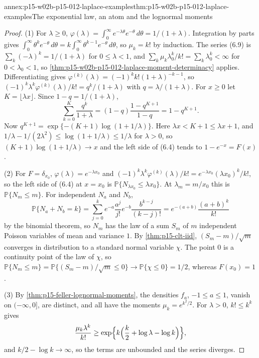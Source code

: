 \begin{annexitem}{annex:p15-w02b-p15-012-laplace-examples}{thm:p15-w02b-p15-012-laplace-examples}{The exponential law, an atom and the lognormal moments}
\begin{proof}
(1) For \(\lambda\geq0\),
\(\varphi(\lambda)=\int_0^\infty e^{-\lambda\theta}e^{-\theta}\,d\theta=1/(1+\lambda)\).
Integration by parts gives
\(\int_0^\infty\theta^ke^{-\theta}\,d\theta=k\int_0^\infty\theta^{k-1}e^{-\theta}\,d\theta\),
so \(\mu_k=k!\) by induction. The series (6.9) is
\(\sum_k(-\lambda)^k=1/(1+\lambda)\) for \(0\leq\lambda<1\), and
\(\sum_k\mu_k\lambda_0^k/k!=\sum_k\lambda_0^k<\infty\) for
\(0<\lambda_0<1\), so \cref{thm:p15-w02b-p15-012-laplace-moment-determinacy}
applies. Differentiating gives
\(\varphi^{(k)}(\lambda)=(-1)^kk!(1+\lambda)^{-k-1}\), so
\((-1)^k\lambda^k\varphi^{(k)}(\lambda)/k!=q^k/(1+\lambda)\) with
\(q=\lambda/(1+\lambda)\). For \(x\geq0\) let \(K=\lfloor\lambda x\rfloor\).
Since \(1-q=1/(1+\lambda)\),
\[
 \sum_{k=0}^K\frac{q^k}{1+\lambda}=(1-q)\frac{1-q^{K+1}}{1-q}=1-q^{K+1}.
\]
Now \(q^{K+1}=\exp\{-(K+1)\log(1+1/\lambda)\}\). Here
\(\lambda x<K+1\leq\lambda x+1\), and
\(1/\lambda-1/(2\lambda^2)\leq\log(1+1/\lambda)\leq1/\lambda\) for
\(\lambda>0\), so \((K+1)\log(1+1/\lambda)\to x\) and the left side of (6.4)
tends to \(1-e^{-x}=F(x)\).

(2) For \(F=\delta_{x_0}\), \(\varphi(\lambda)=e^{-\lambda x_0}\) and
\((-1)^k\lambda^k\varphi^{(k)}(\lambda)/k!=e^{-\lambda x_0}(\lambda x_0)^k/k!\),
so the left side of (6.4) at \(x=x_0\) is
\(\mathbb P\{N_{\lambda x_0}\leq\lambda x_0\}\). At \(\lambda_m=m/x_0\) this
is \(\mathbb P\{N_m\leq m\}\). For independent \(N_a\) and \(N_b\),
\[
 \mathbb P\{N_a+N_b=k\}=\sum_{j=0}^ke^{-a}\frac{a^j}{j!}e^{-b}\frac{b^{k-j}}{(k-j)!}
   =e^{-(a+b)}\frac{(a+b)^k}{k!}
\]
by the binomial theorem, so \(N_m\) has the law of a sum \(S_m\) of \(m\)
independent Poisson variables of mean and variance \(1\). By
\cref{thm:p15-clt-iid}, \((S_m-m)/\sqrt m\) converges in distribution to a
standard normal variable \(\chi\). The point \(0\) is a continuity point of
the law of \(\chi\), so
\(\mathbb P\{N_m\leq m\}=\mathbb P\{(S_m-m)/\sqrt m\leq0\}\to
\mathbb P\{\chi\leq0\}=1/2\), whereas \(F(x_0)=1\).

(3) By \cref{thm:p15-feller-lognormal-moments}, the densities \(f_a\),
\(-1\leq a\leq1\), vanish on \((-\infty,0]\), are distinct, and all have the
moments \(\mu_k=e^{k^2/2}\). For \(\lambda>0\), \(k!\leq k^k\) gives
\[
 \frac{\mu_k\lambda^k}{k!}\geq\exp\Bigl\{k\Bigl(\frac k2+\log\lambda-\log k\Bigr)\Bigr\},
\]
and \(k/2-\log k\to\infty\), so the terms are unbounded and the series
diverges.
\end{proof}
\end{annexitem}

